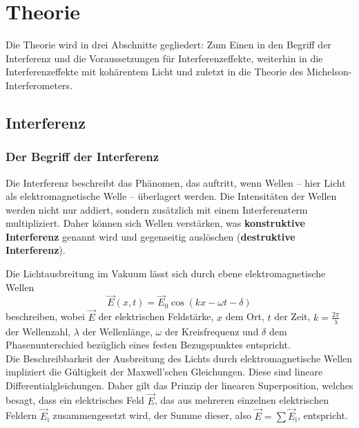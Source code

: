 \section{Theorie}
\label{sec:Theorie}

Die Theorie wird in drei Abschnitte gegliedert: Zum Einen in den Begriff der Interferenz und
die Voraussetzungen für Interferenzeffekte, weiterhin in die Interferenzeffekte mit
kohärentem Licht und zuletzt in die Theorie des Michelson-Interferometers.


\subsection{Interferenz}
\label{sec:interferenz}

\subsubsection{Der Begriff der Interferenz}
\label{sec:interferenzdef}
Die Interferenz beschreibt das Phänomen, das auftritt, wenn Wellen -- hier Licht als
elektromagnetische Welle -- überlagert werden.
Die Intensitäten der Wellen werden nicht nur addiert, sondern zusätzlich mit einem
Interferenzterm multipliziert. Daher können sich Wellen verstärken, was \textbf{konstruktive
Interferenz} genannt wird und gegenseitig auslöschen (\textbf{destruktive Interferenz}).

Die Lichtausbreitung im Vakuum lässt sich durch ebene elektromagnetische Wellen
\begin{equation}
	\label{eqn:ebenewelle}
	\vec{E}(x,t) = \vec{E}_0 \cos(k x - \omega t - \delta)
\end{equation}
beschreiben, wobei $\vec{E}$ der elektrischen Feldstärke, $x$ dem Ort, $t$ der Zeit, $k=\frac{2\pi}{\lambda}$ der Wellenzahl, $\lambda$
der Wellenlänge, $\omega$ der Kreisfrequenz und $\delta$ dem Phasenunterschied bezüglich eines
festen Bezugspunktes entspricht.\\
Die Beschreibbarkeit der Ausbreitung des Lichts durch elektromagnetische Wellen impliziert die
Gültigkeit der Maxwell'schen Gleichungen. Diese sind lineare Differentialgleichungen. Daher
gilt das Prinzip der linearen Superposition, welches besagt, dass ein elektrisches Feld
$\vec{E}$, das aus mehreren einzelnen elektrischen Feldern $\vec{E}_{\mathrm{i}}$
zusammengesetzt wird, der Summe dieser, also $\vec{E} = \sum \vec{E}_{\mathrm{i}}$, entspricht.

